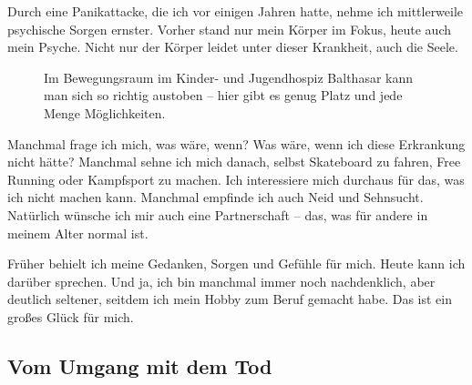 \documentclass[fontsize=14pt,a4paper,headinclude,DIV=calc,automark]{scrbook}
\begin{document}
Durch eine Panikattacke, die ich vor einigen Jahren hatte, nehme ich mittlerweile psychische Sorgen ernster. Vorher stand nur mein Körper im Fokus, heute auch mein Psyche. Nicht nur der Körper leidet unter dieser Krankheit, auch die Seele.

\setlength{\fboxsep}{0pt}    %
\setlength{\fboxrule}{0.2pt} %
\begin{figure}[H]
    \centering
    \caption{Im Bewegungsraum im Kinder- und Jugendhospiz Balthasar kann man sich so richtig austoben – hier gibt es genug Platz und jede Menge Möglichkeiten.}
    \label{fig:bewegungsraum}
\end{figure}

Manchmal frage ich mich, was wäre, wenn? Was wäre, wenn ich diese Erkrankung nicht hätte? Manchmal sehne ich mich danach, selbst Skateboard zu fahren, Free Running oder Kampfsport zu machen. Ich interessiere mich durchaus für das, was ich nicht machen kann. Manchmal empfinde ich auch Neid und Sehnsucht. Natürlich wünsche ich mir auch eine Partnerschaft – das, was für andere in meinem Alter normal ist.

Früher behielt ich meine Gedanken, Sorgen und Gefühle für mich. Heute kann ich darüber sprechen. Und ja, ich bin manchmal immer noch nachdenklich, aber deutlich seltener, seitdem ich mein Hobby zum Beruf gemacht habe. Das ist ein großes Glück für mich.

\subsection{Vom Umgang mit dem Tod}
\end{document}
